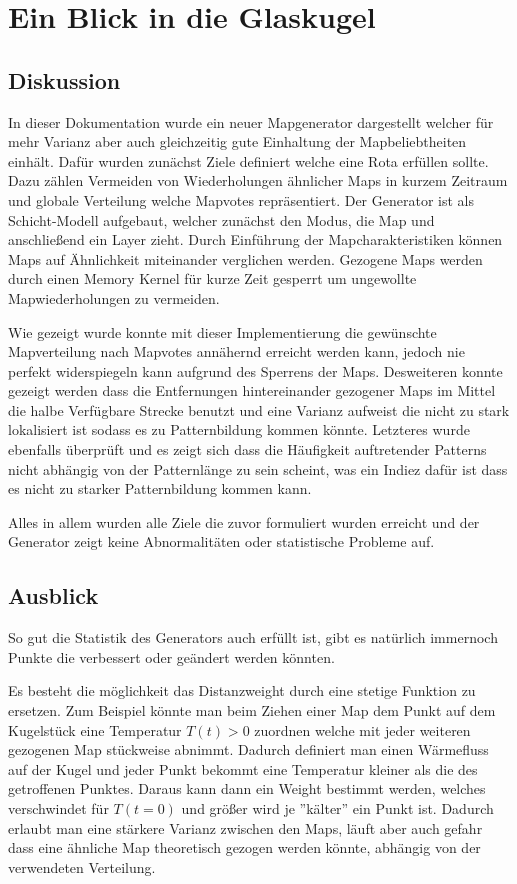 \section{Ein Blick in die Glaskugel}
    \subsection{Diskussion}
    	In dieser Dokumentation wurde ein neuer Mapgenerator dargestellt welcher für mehr Varianz aber auch gleichzeitig gute Einhaltung der Mapbeliebtheiten einhält.
        Dafür wurden zunächst Ziele definiert welche eine Rota erfüllen sollte. 
        Dazu zählen Vermeiden von Wiederholungen ähnlicher Maps in kurzem Zeitraum und globale Verteilung welche Mapvotes repräsentiert.
        Der Generator ist als Schicht-Modell aufgebaut, welcher zunächst den Modus, die Map und anschließend ein Layer zieht. 
        Durch Einführung der Mapcharakteristiken können Maps auf Ähnlichkeit miteinander verglichen werden.
        Gezogene Maps werden durch einen Memory Kernel für kurze Zeit gesperrt um ungewollte Mapwiederholungen zu vermeiden.
        
        Wie gezeigt wurde konnte mit dieser Implementierung die gewünschte Mapverteilung nach Mapvotes annähernd erreicht werden kann, jedoch nie perfekt widerspiegeln kann aufgrund des Sperrens der Maps.
        Desweiteren konnte gezeigt werden dass die Entfernungen hintereinander gezogener Maps im Mittel die halbe Verfügbare Strecke benutzt und eine Varianz aufweist die nicht zu stark lokalisiert ist sodass es zu Patternbildung kommen könnte.
        Letzteres wurde ebenfalls überprüft und es zeigt sich dass die Häufigkeit auftretender Patterns nicht abhängig von der Patternlänge zu sein scheint, was ein Indiez dafür ist dass es nicht zu starker Patternbildung kommen kann. 

        Alles in allem wurden alle Ziele die zuvor formuliert wurden erreicht und der Generator zeigt keine Abnormalitäten oder statistische Probleme auf.

    \subsection{Ausblick}
        So gut die Statistik des Generators auch erfüllt ist, gibt es natürlich immernoch Punkte die verbessert oder geändert werden könnten.
        
        Es besteht die möglichkeit das Distanzweight durch eine stetige Funktion zu ersetzen. 
        Zum Beispiel könnte man beim Ziehen einer Map dem Punkt auf dem Kugelstück eine Temperatur $T(t)>0$ zuordnen welche mit jeder weiteren gezogenen Map stückweise abnimmt.
        Dadurch definiert man einen Wärmefluss auf der Kugel und jeder Punkt bekommt eine Temperatur kleiner als die des getroffenen Punktes. 
        Daraus kann dann ein Weight bestimmt werden, welches verschwindet für $T(t=0)$ und größer wird je ''kälter'' ein Punkt ist. 
        Dadurch erlaubt man eine stärkere Varianz zwischen den Maps, läuft aber auch gefahr dass eine ähnliche Map theoretisch gezogen werden könnte, abhängig von der verwendeten Verteilung.
        
